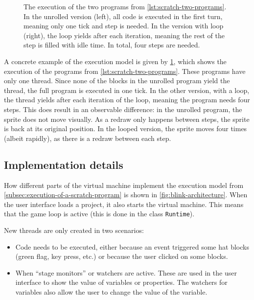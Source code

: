 \documentclass[../main]{subfiles}
\begin{document}
\begin{figure}
    \centering
    \begin{subfigure}{0.40\textwidth}
        
    \end{subfigure}
    \begin{subfigure}{0.59\textwidth}
        
    \end{subfigure}
    \caption{The execution of the two programs from \cref{lst:scratch-two-programs}. In the unrolled version (left), all code is executed in the first turn, meaning only one tick and step is needed. In the version with loop (right), the loop yields after each iteration, meaning the rest of the step is filled with idle time. In total, four steps are needed. }
    \label{fig:scratch-two-execution}
\end{figure}

A concrete example of the execution model is given by \cref{fig:scratch-two-execution}, which shows the execution of the programs from \cref{lst:scratch-two-programs}.
These programs have only one thread.
Since none of the blocks in the unrolled program yield the thread, the full program is executed in one tick.
In the other version, with a loop, the thread yields after each iteration of the loop, meaning the program needs four steps.
This does result in an observable difference: in the unrolled program, the sprite does not move visually.
As a redraw only happens between steps, the sprite is back at its original position.
In the looped version, the sprite moves four times (albeit rapidly), as there is a redraw between each step.

\subsection{Implementation details}\label{subsec:implementation-details}

How different parts of the virtual machine implement the execution model from \cref{subsec:execution-of-a-scratch-program} is shown in \cref{fig:blink-architecture}.
When the user interface loads a project, it also starts the virtual machine.
This means that the game loop is active (this is done in the class \texttt{Runtime}).

New threads are only created in two scenarios:
\begin{itemize}[noitemsep]
    \item Code needs to be executed, either because an event triggered some hat blocks (green flag, key press, etc.) or because the user clicked on some blocks.
    \item When ``stage monitors'' or watchers are active.
        These are used in the user interface to show the value of variables or properties.
        The watchers for variables also allow the user to change the value of the variable.
\end{itemize}
\end{document}
